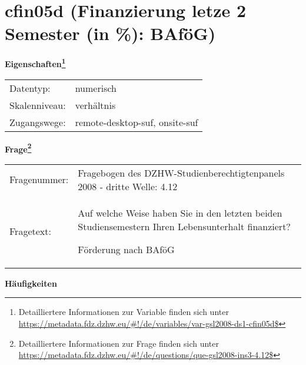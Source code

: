 
    \setcounter{footnote}{0}

    \vspace*{-1.8cm}
	\section{cfin05d (Finanzierung letze 2 Semester (in \%): BAföG)}
	\label{section:cfin05d}



    \vspace*{0.5cm}
    \noindent\textbf{Eigenschaften\footnote{Detailliertere Informationen zur Variable finden sich unter
		\url{https://metadata.fdz.dzhw.eu/\#!/de/variables/var-gsl2008-ds1-cfin05d$}}}\\
	\begin{tabularx}{\hsize}{@{}lX}
	Datentyp: & numerisch \\
	Skalenniveau: & verhältnis \\
	Zugangswege: &
	  remote-desktop-suf, 
	  onsite-suf
 \\
    \end{tabularx}



				\vspace*{0.5cm}
                \noindent\textbf{Frage\footnote{Detailliertere Informationen zur Frage finden sich unter
		              \url{https://metadata.fdz.dzhw.eu/\#!/de/questions/que-gsl2008-ins3-4.12$}}}\\
				\begin{tabularx}{\hsize}{@{}lX}
					Fragenummer: &
					  Fragebogen des DZHW-Studienberechtigtenpanels 2008 - dritte Welle:
					  4.12
 \\
					Fragetext: & Auf welche Weise haben Sie in den letzten beiden Studiensemestern Ihren Lebensunterhalt finanziert?\par  Förderung nach BAföG \\
				\end{tabularx}





        		\vspace*{0.5cm}
                \noindent\textbf{Häufigkeiten}

